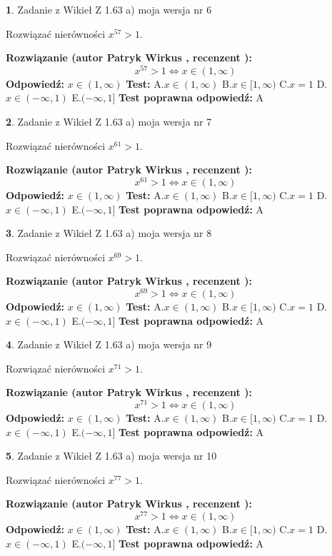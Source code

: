 \documentclass[12pt, a4paper]{article}
\theoremstyle{definition} %
\newtheorem{zad}{}
\newcommand{\zadStart}[1]{\begin{zad}#1\newline}
\newcommand{\zadStop}{\end{zad}}
\newcommand{\rozwStart}[2]{\noindent \textbf{Rozwiązanie (autor #1 , recenzent #2): }\newline}
\newcommand{\rozwStop}{\newline}
\newcommand{\odpStart}{\noindent \textbf{Odpowiedź:}\newline}
\newcommand{\odpStop}{\newline}
\newcommand{\testStart}{\noindent \textbf{Test:}\newline}
\newcommand{\testStop}{\newline}
\newcommand{\kluczStart}{\noindent \textbf{Test poprawna odpowiedź:}\newline}
\newcommand{\kluczStop}{\newline}
\begin{document}
\zadStart{Zadanie z Wikieł Z 1.63 a) moja wersja nr 6}

Rozwiązać nierówności $x^{57} > 1$.
\zadStop
\rozwStart{Patryk Wirkus}{}
$$x^{57} > 1 \iff x \in (1,\infty)$$
\rozwStop
\odpStart
$x \in (1,\infty)$
\odpStop
\testStart
A.$x \in (1,\infty)$ B.$x \in [1,\infty)$ C.$x = 1$ D.$x \in (-\infty,1)$ E.$(-\infty,1]$
\testStop
\kluczStart
A
\kluczStop



\zadStart{Zadanie z Wikieł Z 1.63 a) moja wersja nr 7}

Rozwiązać nierówności $x^{61} > 1$.
\zadStop
\rozwStart{Patryk Wirkus}{}
$$x^{61} > 1 \iff x \in (1,\infty)$$
\rozwStop
\odpStart
$x \in (1,\infty)$
\odpStop
\testStart
A.$x \in (1,\infty)$ B.$x \in [1,\infty)$ C.$x = 1$ D.$x \in (-\infty,1)$ E.$(-\infty,1]$
\testStop
\kluczStart
A
\kluczStop



\zadStart{Zadanie z Wikieł Z 1.63 a) moja wersja nr 8}

Rozwiązać nierówności $x^{69} > 1$.
\zadStop
\rozwStart{Patryk Wirkus}{}
$$x^{69} > 1 \iff x \in (1,\infty)$$
\rozwStop
\odpStart
$x \in (1,\infty)$
\odpStop
\testStart
A.$x \in (1,\infty)$ B.$x \in [1,\infty)$ C.$x = 1$ D.$x \in (-\infty,1)$ E.$(-\infty,1]$
\testStop
\kluczStart
A
\kluczStop



\zadStart{Zadanie z Wikieł Z 1.63 a) moja wersja nr 9}

Rozwiązać nierówności $x^{71} > 1$.
\zadStop
\rozwStart{Patryk Wirkus}{}
$$x^{71} > 1 \iff x \in (1,\infty)$$
\rozwStop
\odpStart
$x \in (1,\infty)$
\odpStop
\testStart
A.$x \in (1,\infty)$ B.$x \in [1,\infty)$ C.$x = 1$ D.$x \in (-\infty,1)$ E.$(-\infty,1]$
\testStop
\kluczStart
A
\kluczStop



\zadStart{Zadanie z Wikieł Z 1.63 a) moja wersja nr 10}

Rozwiązać nierówności $x^{77} > 1$.
\zadStop
\rozwStart{Patryk Wirkus}{}
$$x^{77} > 1 \iff x \in (1,\infty)$$
\rozwStop
\odpStart
$x \in (1,\infty)$
\odpStop
\testStart
A.$x \in (1,\infty)$ B.$x \in [1,\infty)$ C.$x = 1$ D.$x \in (-\infty,1)$ E.$(-\infty,1]$
\testStop
\kluczStart
A
\kluczStop
\end{document}

